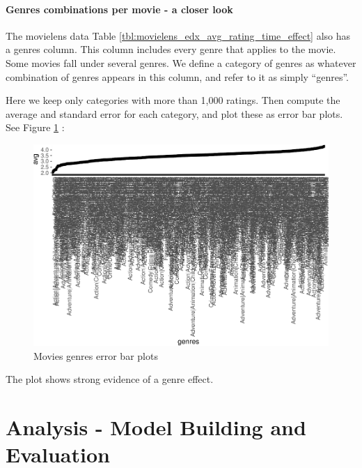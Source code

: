 \documentclass[
]{article}
\begin{document}
\newpage

\hypertarget{genres-combinations-per-movie---a-closer-look}{%
\paragraph{Genres combinations per movie - a closer
look}\label{genres-combinations-per-movie---a-closer-look}}

The movielens data Table \ref{tbl:movielens_edx_avg_rating_time_effect}
also has a genres column. This column includes every genre that applies
to the movie. Some movies fall under several genres. We define a
category of genres as whatever combination of genres appears in this
column, and refer to it as simply ``genres''.

Here we keep only categories with more than 1,000 ratings. Then compute
the average and standard error for each category, and plot these as
error bar plots. See Figure \ref{fig:genres_error_bar_plots} :

\begin{figure}
\centering
\includegraphics{figures/gnr-1.pdf}
\caption{Movies genres error bar
plots\label{fig:genres_error_bar_plots}}
\end{figure}

The plot shows strong evidence of a genre effect.

\newpage

\hypertarget{analysis---model-building-and-evaluation}{%
\section{Analysis - Model Building and
Evaluation}\label{analysis---model-building-and-evaluation}}
\end{document}
